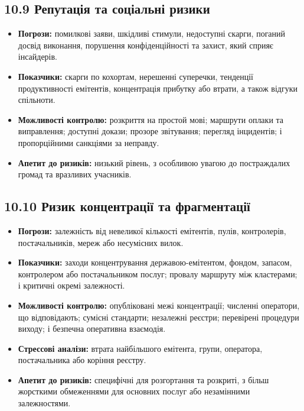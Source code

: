 \documentclass[11pt]{article}
\begin{document}
\subsection*{10.9 Репутація та соціальні ризики}

\begin{itemize}[leftmargin=*]
\item \textbf{Погрози:} помилкові заяви, шкідливі стимули, недоступні скарги, поганий досвід виконання, порушення конфіденційності та захист, який сприяє інсайдерів.
\item \textbf{Показчики:} скарги по кохортам, нерешенні суперечки, тенденції продуктивності емітентів, концентрація прибутку або втрати, а також відгуки спільноти.
\item \textbf{Можливості контролю:} розкриття на простой мові; маршрути оплаки та виправлення; доступні докази; прозоре звітування; перегляд інцидентів; і пропорційними санкціями за неправду.
\item \textbf{Апетит до ризиків:} низький рівень, з особливою увагою до постраждалих громад та вразливих учасників.
\end{itemize}
\subsection*{10.10 Ризик концентрації та фрагментації}

\begin{itemize}[leftmargin=*]
\item \textbf{Погрози:} залежність від невеликої кількості емітентів, пулів, контролерів, постачальників, мереж або несумісних вилок.
\item \textbf{Показчики:} заходи концентрування державою-емітентом, фондом, запасом, контролером або постачальником послуг; провалу маршруту між кластерами; і критичні окремі залежності.
\item \textbf{Можливості контролю:} опубліковані межі концентрації; численні оператори, що відповідають; сумісні стандарти; незалежні реєстри; перевірені процедури виходу; і безпечна оперативна взаємодія.
\item \textbf{Стрессові аналізи:} втрата найбільшого емітента, групи, оператора, постачальника або коріння реєстру.
\item \textbf{Апетит до ризиків:} специфічні для розгортання та розкриті, з більш жорсткими обмеженнями для основних послуг або незамінними залежностями.
\end{itemize}
\end{document}
